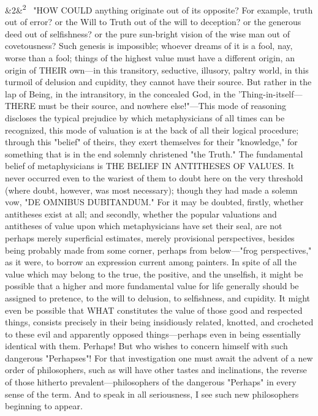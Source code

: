 \documentclass[12pt]{article}
\newcommand{\para}[1][]{\par\noindent\ifx&#1&\else\textsuperscript{\footnotesize #1}~\fi}
\begin{document}
\para[2] "HOW COULD anything originate out of its opposite? For example, truth out of error? or the Will to Truth out of the will to deception? or the generous deed out of selfishness? or the pure sun-bright vision of the wise man out of covetousness? Such genesis is impossible; whoever dreams of it is a fool, nay, worse than a fool; things of the highest value must have a different origin, an origin of THEIR own---in this transitory, seductive, illusory, paltry world, in this turmoil of delusion and cupidity, they cannot have their source. But rather in the lap of Being, in the intransitory, in the concealed God, in the 'Thing-in-itself---THERE must be their source, and nowhere else!"---This mode of reasoning discloses the typical prejudice by which metaphysicians of all times can be recognized, this mode of valuation is at the back of all their logical procedure; through this "belief" of theirs, they exert themselves for their "knowledge," for something that is in the end solemnly christened "the Truth." The fundamental belief of metaphysicians is THE BELIEF IN ANTITHESES OF VALUES. It never occurred even to the wariest of them to doubt here on the very threshold (where doubt, however, was most necessary); though they had made a solemn vow, "DE OMNIBUS DUBITANDUM." For it may be doubted, firstly, whether antitheses exist at all; and secondly, whether the popular valuations and antitheses of value upon which metaphysicians have set their seal, are not perhaps merely superficial estimates, merely provisional perspectives, besides being probably made from some corner, perhaps from below---"frog perspectives," as it were, to borrow an expression current among painters. In spite of all the value which may belong to the true, the positive, and the unselfish, it might be possible that a higher and more fundamental value for life generally should be assigned to pretence, to the will to delusion, to selfishness, and cupidity. It might even be possible that WHAT constitutes the value of those good and respected things, consists precisely in their being insidiously related, knotted, and crocheted to these evil and apparently opposed things---perhaps even in being essentially identical with them. Perhaps! But who wishes to concern himself with such dangerous "Perhapses"! For that investigation one must await the advent of a new order of philosophers, such as will have other tastes and inclinations, the reverse of those hitherto prevalent---philosophers of the dangerous "Perhaps" in every sense of the term. And to speak in all seriousness, I see such new philosophers beginning to appear.
\end{document}
